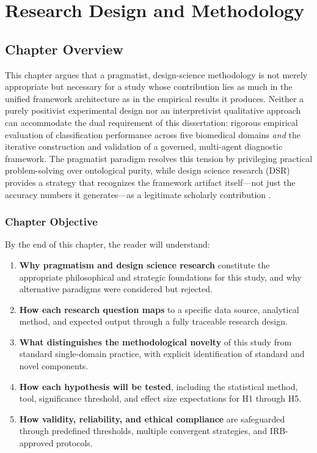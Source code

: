 
\chapter{Research Design and Methodology}
\label{chap:methodology}

\section{Chapter Overview}
\label{sec:meth_intro}

This chapter argues that a pragmatist, design-science methodology is not merely appropriate but necessary for a study whose contribution lies as much in the unified framework architecture as in the empirical results it produces. Neither a purely positivist experimental design nor an interpretivist qualitative approach can accommodate the dual requirement of this dissertation: rigorous empirical evaluation of classification performance across five biomedical domains \textit{and} the iterative construction and validation of a governed, multi-agent diagnostic framework. The pragmatist paradigm resolves this tension by privileging practical problem-solving over ontological purity, while design science research (DSR) provides a strategy that recognizes the framework artifact itself---not just the accuracy numbers it generates---as a legitimate scholarly contribution \citep{creswell2018research}.

\subsection{Chapter Objective}

By the end of this chapter, the reader will understand:

\begin{enumerate}[label=(\alph*)]
    \item \textbf{Why pragmatism and design science research} constitute the appropriate philosophical and strategic foundations for this study, and why alternative paradigms were considered but rejected.
    \item \textbf{How each research question maps} to a specific data source, analytical method, and expected output through a fully traceable research design.
    \item \textbf{What distinguishes the methodological novelty} of this study from standard single-domain practice, with explicit identification of standard and novel components.
    \item \textbf{How each hypothesis will be tested}, including the statistical method, tool, significance threshold, and effect size expectations for H1 through H5.
    \item \textbf{How validity, reliability, and ethical compliance} are safeguarded through predefined thresholds, multiple convergent strategies, and IRB-approved protocols.
\end{enumerate}

